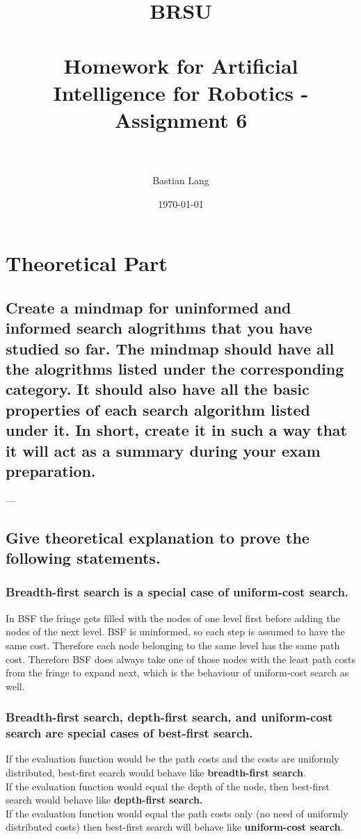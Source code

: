 \documentclass[paper=a4, fontsize=11pt]{scrartcl} %
\title{	
\normalfont \normalsize 
\textsc{BRSU} \\ [25pt] %
\horrule{0.5pt} \\[0.4cm] %
\huge Homework for Artificial Intelligence for Robotics - Assignment 6 \\ %
\horrule{2pt} \\[0.5cm] %
}
\author{Bastian Lang} %
\date{\normalsize\today} %
\numberwithin{equation}{section} %
\numberwithin{figure}{section} %
\numberwithin{table}{section} %
\begin{document}
\maketitle %

\section{Theoretical Part}

\subsection{Create a mindmap for uninformed and informed search alogrithms that you have studied so
far. The mindmap should have all the alogrithms listed under the corresponding category.
It should also have all the basic properties of each search algorithm listed under it. In
short, create it in such a way that it will act as a summary during your exam preparation.}

---

\subsection{Give theoretical explanation to prove the following statements.}

\subsubsection{Breadth-first search is a special case of uniform-cost search.}
In BSF the fringe gets filled with the nodes of one level first before adding the nodes of the next level. BSF is uninformed, so each step is assumed to have the same cost. Therefore each node belonging to the same level has the same path cost. Therefore BSF does always take one of those nodes with the least path costs from the fringe to expand next, which is the behaviour of uniform-cost search as well.

\subsubsection{Breadth-first search, depth-first search, and uniform-cost search are special cases of
best-first search.}
If the evaluation function would be the path costs and the costs are uniformly distributed, best-first search would behave like \textbf{breadth-first search}.\\
If the evaluation function would equal the depth of the node, then best-first search would behave like \textbf{depth-first search.}\\
If the evaluation function would equal the path costs only (no need of uniformly distributed costs) then best-first search will behave like \textbf{uniform-cost search}.
\end{document}

